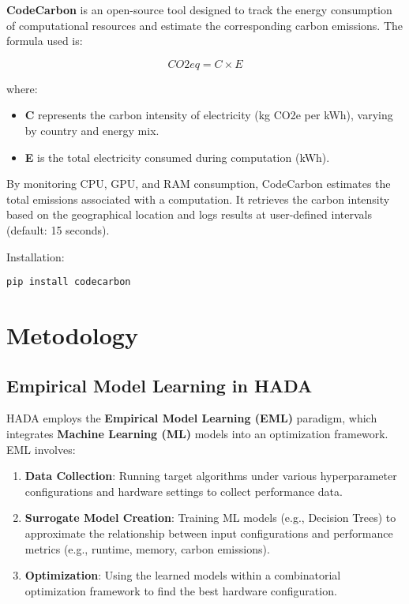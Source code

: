 \documentclass[a4paper,singleside,12pt]{report} %
\begin{document}
\textbf{CodeCarbon} is an open-source tool designed to track the energy consumption of computational resources 
and estimate the corresponding carbon emissions. The formula used is:

\begin{equation}
CO2eq = C \times E
\end{equation}

where:
\begin{itemize}
\item \textbf{C} represents the carbon intensity of electricity (kg CO2e per kWh), varying by country and energy mix.
\item \textbf{E} is the total electricity consumed during computation (kWh).
\end{itemize}

By monitoring CPU, GPU, and RAM consumption, CodeCarbon estimates the total emissions associated with a computation. 
It retrieves the carbon intensity based on the geographical location and logs results at user-defined intervals 
(default: 15 seconds).

Installation:
\begin{verbatim}
pip install codecarbon
\end{verbatim}

\chapter{Metodology}

\section{Empirical Model Learning in HADA}

HADA employs the \textbf{Empirical Model Learning (EML)} paradigm, which integrates \textbf{Machine Learning (ML)} models 
into an optimization framework. EML involves:

\begin{enumerate}
\item \textbf{Data Collection}: Running target algorithms under various hyperparameter configurations and hardware settings 
to collect performance data.
\item \textbf{Surrogate Model Creation}: Training ML models (e.g., Decision Trees) to approximate the relationship between 
input configurations and performance metrics (e.g., runtime, memory, carbon emissions).
\item \textbf{Optimization}: Using the learned models within a combinatorial optimization framework to find the best hardware
 configuration.
\end{enumerate}
\end{document}
